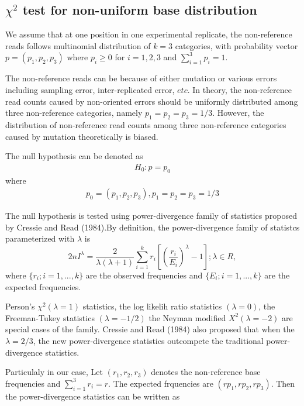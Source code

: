 \documentclass[11pt,reqno]{amsart}
\begin{document}
\subsection{$\chi^2$ test for non-uniform base distribution}

We assume that at one position in one experimental replicate, the non-reference reads follows multinomial distribution of $k = 3$ categories, with probability vector $p = (p_1, p_2, p_3)$ where $p_i \geq 0$ for $i =1, 2, 3$ and $\sum_{i=1}^3 p_i = 1$.

The non-reference reads can be because of either mutation or various errors including sampling error, inter-replicated error, $etc$. In theory, the non-reference read counts caused by non-oriented errors should be uniformly distributed among three non-reference categories, namely $p_1=p_2=p_3=1/3$. However, the distribution of non-reference read counts among three non-reference categories caused by mutation theoretically is biased. 

The null hypothesis can be denoted as
\begin{align}
 H_0: p=p_0
\end{align}
where
\begin{align} 
 p_0=(p_1,p_2,p_3), p_1=p_2=p_3=1/3
\end{align}

The null hypothesis is tested using power-divergence family of statistics proposed by Cressie and Read (1984).By definition, the power-divergence family of statistcs parameterized with $\lambda$ is 
\begin{equation}
 2nI^\lambda = \frac{2}{\lambda(\lambda+1)}\sum_{i=1}^k r_i \left[\left(\frac{r_i}{E_i}\right)^\lambda-1\right];\lambda \in R,
\end{equation}
where $\{r_i; i=1,...,k\}$ are the observed frequencies and $\{E_i; i=1,...,k\}$ are the  expected frequencies.

Person's $\chi^2 (\lambda = 1)$ statistics, the log likelih ratio statistics $(\lambda = 0)$, the Freeman-Tukey statistics $(\lambda = -1/2)$ the Neyman modified $X^2 (\lambda = -2)$ are special cases of the family. Cressie and Read (1984) also proposed that when the $\lambda =2/3$, the new power-divergence statistics outcompete the traditional power-divergence statistics. 

Particulaly in our case, Let $(r_1,r_2,r_3)$ denotes the non-reference base frequencies and $\sum_{i=1}^3 r_i = r$. The expected frquencies are $(rp_1, rp_2, rp_3)$. Then the power-divergence statistics can be written as
\end{document}
